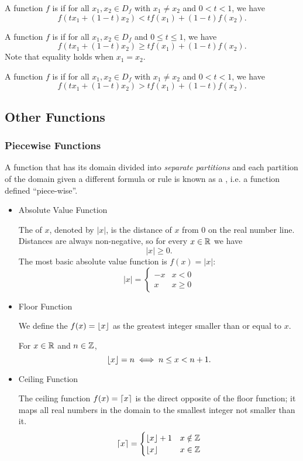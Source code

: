 \begin{definition}
A function $f$ is  if for all $x_1,x_2\in D_f$ with $x_1\neq x_2$ and $0<t<1$, we have
\[ f(tx_1+(1-t)x_2)<tf(x_1)+(1-t)f(x_2). \]
\end{definition}

\begin{definition}
A function $f$ is  if for all $x_1,x_2\in D_f$ and $0\le t\le 1$, we have
\[ f(tx_1+(1-t)x_2)\ge tf(x_1)+(1-t)f(x_2). \]
Note that equality holds when $x_1=x_2$.
\end{definition}

\begin{definition}
A function $f$ is  if for all $x_1,x_2\in D_f$ with $x_1\neq x_2$ and $0<t<1$, we have
\[ f(tx_1+(1-t)x_2)>tf(x_1)+(1-t)f(x_2). \]
\end{definition}

\subsection{Other Functions}
\subsubsection{Piecewise Functions}
A function that has its domain divided into \emph{separate partitions} and each partition of the domain given a different formula or rule is known as a , i.e. a function defined ``piece-wise''.

\begin{itemize}
\item Absolute Value Function

The  of $x$, denoted by $|x|$, is the distance of $x$ from $0$ on the real number line. Distances are always non-negative, so for every $x\in\mathbb R$ we have 
\[ |x|\ge0. \]
The most basic absolute value function is $f(x)=|x|$:
\[ |x|=\begin{cases}
-x & x<0 \\
x & x\ge0
\end{cases} \]

\item Floor Function

We define the  $f(x)=\left\lfloor x \right\rfloor$ as the greatest integer smaller than or equal to $x$.

For $x\in\mathbb R$ and $n\in\mathbb Z$,
\[ \left\lfloor x \right\rfloor=n\iff n\le x<n+1. \]

\item Ceiling Function

The ceiling function $f(x)=\left\lceil x \right\rceil$ is the direct opposite of the floor function; it maps all real numbers in the domain to the smallest integer not smaller than it.
\[ \left\lceil x \right\rceil=\begin{cases}
\left\lfloor x \right\rfloor+1 & x\notin\mathbb Z \\
\left\lfloor x \right\rfloor & x\in\mathbb Z
\end{cases} \]
\end{itemize}

